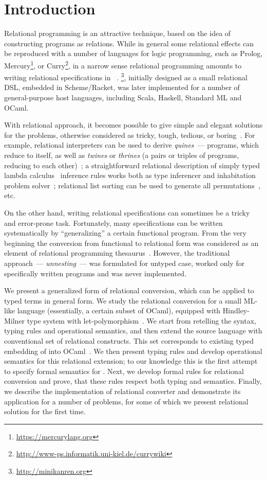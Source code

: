\section{Introduction}
\label{intro}

Relational programming is an attractive technique, based on the idea of constructing programs as relations.
While in general some relational effects can be reproduced with a number of languages for logic programming, such as
Prolog, Mercury\footnote{\url{https://mercurylang.org}}, or Curry\footnote{\url{http://www-ps.informatik.uni-kiel.de/currywiki}}, in
a narrow sense relational programming amounts to writing relational specifications in \miniKanren~\cite{TRS}. \miniKanren\footnote{\url{http://minikanren.org}},
initially designed as a small relational DSL, embedded in Scheme/Racket, was later implemented for a number of general-purpose host languages,
including Scala, Haskell, Standard ML and OCaml.

With relational approach, it becomes possible to give simple and elegant solutions for the problems, otherwise
considered as tricky, tough, tedious, or boring~\cite{unified}. For example, relational interpreters can be used to derive
\emph{quines}~--- programs, which reduce to itself, as well as \emph{twines} or \emph{thrines} (a pairs or triples of
programs, reducing to each other)~\cite{Untagged}; a straightforward relational description of
simply typed lambda calculus~\cite{Lambda} inference rules works both as type inferencer and inhabitation problem solver~\cite{WillThesis};
relational list sorting can be used to generate all permutations~\cite{ocanren}, etc. 

On the other hand, writing relational specifications can sometimes be a tricky and error-prone task. Fortunately, many 
specifications can be written systematically by ``generalizing'' a certain functional program. From the very beginning 
the conversion from functional to relational form was considered as an element of relational programming thesaurus~\cite{TRS}. However,
the traditional approach~--- \emph{unnesting}~--- was formulated for untyped case, worked only for specifically written
programs and was never implemented.

We present a generalized form of relational conversion, which can be applied to typed terms in general form. We study the relational conversion 
for a small ML-like language (essentially, a certain subset of OCaml), equipped with Hindley-Milner type system with let-polymorphism~\cite{Types}. 
We start from retelling the syntax, typing rules and operational semantics, and then extend the source language with conventional set of 
relational constructs. This set corresponds to existing typed embedding of \miniKanren into OCaml~\cite{ocanren}. We then present typing rules and 
develop operational semantics for this relational extension; to our knowledge this is the first attempt to specify formal semantics for
\miniKanren. Next, we develop formal rules for relational conversion and prove, that these rules respect both typing and
semantics. Finally, we describe the implementation of relational converter and demonstrate its application for a number of problems, for some
of which we present relational solution for the first time.
